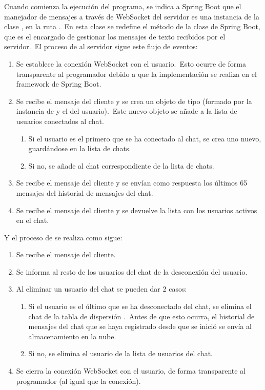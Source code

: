 Cuando comienza la ejecución del programa, se indica a Spring Boot que el manejador de mensajes a través de WebSocket
del servidor es una instancia de la clase , en la ruta
.\ En esta clase se redefine el método  de la clase
 de Spring Boot, que es el encargado de gestionar los mensajes de texto recibidos
por el servidor.\ El proceso de  al servidor sigue este flujo de eventos:

\begin{enumerate}
	\item Se establece la conexión WebSocket con el usuario.\ Esto ocurre de forma transparente al programador debido a
	que la implementación se realiza en el framework de Spring Boot.
	\item Se recibe el mensaje  del cliente y se crea un objeto de tipo 
	(formado por la instancia de  y el  del usuario).\ Este nuevo
	objeto se añade a la lista de usuarios conectados al chat.
	\begin{enumerate}
		\item Si el usuario es el primero que se ha conectado al chat, se crea uno nuevo, guardándose en la lista de
		chats.
		\item Si no, se añade al chat correspondiente de la lista de chats.
	\end{enumerate}
	\item Se recibe el mensaje  del cliente y se envían como respuesta los últimos 65
	mensajes del historial de mensajes del chat.
	\item Se recibe el mensaje  del cliente y se devuelve la lista con los usuarios
	activos en el chat.
\end{enumerate}
\label{itm:backend-connection-life-cycle}
Y el proceso de  se realiza como sigue:

\begin{enumerate}
	\item Se recibe el mensaje  del cliente.
	\item Se informa al resto de los usuarios del chat de la desconexión del usuario.
	\item Al eliminar un usuario del chat se pueden dar 2 casos:
	\begin{enumerate}
		\item Si el usuario es el último que se ha desconectado del chat, se elimina el chat de la tabla de dispersión
		.\ Antes de que esto ocurra, el historial de mensajes del chat que se haya registrado desde
		que se inició se envía al almacenamiento en la nube.
		\item Si no, se elimina el usuario de la lista de usuarios del chat.
	\end{enumerate}
	\item Se cierra la conexión WebSocket con el usuario, de forma transparente al programador (al igual que la
	conexión).
\end{enumerate}

